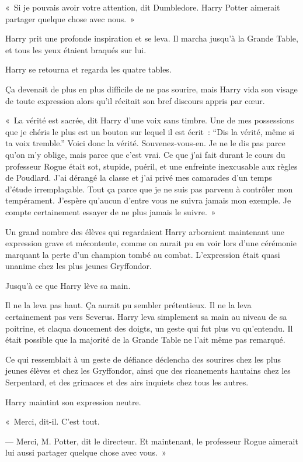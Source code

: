 «~Si je pouvais avoir votre attention, dit Dumbledore.
Harry Potter aimerait partager quelque chose avec nous.~»

Harry prit une profonde inspiration et se leva.
Il marcha jusqu'à la Grande Table, et tous les yeux étaient braqués sur lui.

Harry se retourna et regarda les quatre tables.

Ça devenait de plus en plus difficile de ne pas sourire, mais Harry vida son visage de toute expression alors qu'il récitait son bref discours appris par cœur.

«~La vérité est sacrée, dit Harry d'une voix sans timbre.
Une de mes possessions que je chéris le plus est un bouton sur lequel il est écrit~: “Dis la vérité, même si ta voix tremble.” Voici donc la vérité.
Souvenez-vous-en.
Je ne le dis pas parce qu'on m'y oblige, mais parce que c'est vrai.
Ce que j'ai fait durant le cours du professeur Rogue était sot, stupide, puéril, et une enfreinte inexcusable aux règles de Poudlard.
J'ai dérangé la classe et j'ai privé mes camarades d'un temps d'étude irremplaçable.
Tout ça parce que je ne suis pas parvenu à contrôler mon tempérament.
J'espère qu'aucun d'entre vous ne suivra jamais mon exemple.
Je compte certainement essayer de ne plus jamais le suivre.~»

Un grand nombre des élèves qui regardaient Harry arboraient maintenant une expression grave et mécontente, comme on aurait pu en voir lors d'une cérémonie marquant la perte d'un champion tombé au combat.
L'expression était quasi unanime chez les plus jeunes Gryffondor.

Jusqu'à ce que Harry lève sa main.

Il ne la leva pas haut.
Ça aurait pu sembler prétentieux.
Il ne la leva certainement pas vers Severus.
Harry leva simplement sa main au niveau de sa poitrine, et claqua doucement des doigts, un geste qui fut plus vu qu'entendu.
Il était possible que la majorité de la Grande Table ne l'ait même pas remarqué.

Ce qui ressemblait à un geste de défiance déclencha des sourires chez les plus jeunes élèves et chez les Gryffondor, ainsi que des ricanements hautains chez les Serpentard, et des grimaces et des airs inquiets chez tous les autres.

Harry maintint son expression neutre.

«~Merci, dit-il.
C'est tout.

--- Merci, M. Potter, dit le directeur.
Et maintenant, le professeur Rogue aimerait lui aussi partager quelque chose avec vous.~»

